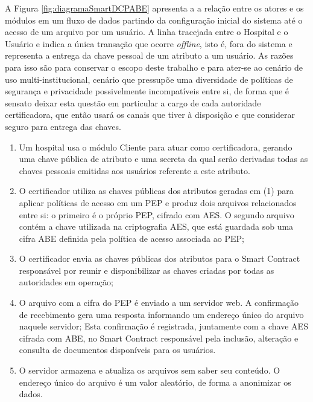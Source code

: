 \documentclass[a4paper,11pt]{article}
\begin{document}
A Figura \ref{fig:diagramaSmartDCPABE} apresenta a a relação entre os atores e os módulos em um fluxo de dados partindo da configuração inicial do sistema até o acesso de um arquivo por um usuário.
A linha tracejada entre o Hospital e o Usuário e indica a única transação que ocorre \emph{offline}, isto é, fora do sistema e representa a entrega da chave pessoal de um atributo a um usuário.
As razões para isso são para conservar o escopo deste trabalho e para ater-se ao cenário de uso multi-institucional, cenário que pressupõe uma diversidade de políticas de segurança e privacidade possivelmente incompatíveis entre si, de forma que é sensato deixar esta questão em particular a cargo de cada autoridade certificadora, que então usará os canais que tiver à disposição e que considerar seguro para entrega das chaves.

\begin{enumerate}[label=(\arabic*)]
  \item Um hospital usa o módulo Cliente para atuar como certificadora, gerando uma chave pública de atributo e uma secreta da qual serão derivadas todas as chaves pessoais emitidas aos usuários referente a este atributo.
  \item O certificador utiliza as chaves públicas dos atributos geradas em (1) para aplicar políticas de acesso em um PEP e produz dois arquivos relacionados entre si:
  o primeiro é o próprio PEP, cifrado com AES.
  O segundo arquivo contém a chave utilizada na criptografia AES, que está guardada sob uma cifra ABE definida pela política de acesso associada ao PEP;%
  \item O certificador envia as chaves públicas dos atributos para o Smart Contract responsável por reunir e disponibilizar as chaves criadas por todas as autoridades em operação;
  \item O arquivo com a cifra do PEP é enviado a um servidor web.
  A confirmação de recebimento gera uma resposta informando um endereço único do arquivo naquele servidor;
  Esta confirmação é registrada, juntamente com a chave AES cifrada com ABE, no Smart Contract responsável pela inclusão, alteração e consulta de documentos disponíveis para os usuários. %
  \item O servidor armazena e atualiza os arquivos sem saber seu conteúdo.
  O endereço único do arquivo é um valor aleatório, de forma a anonimizar os dados.

\end{enumerate}
\end{document}
